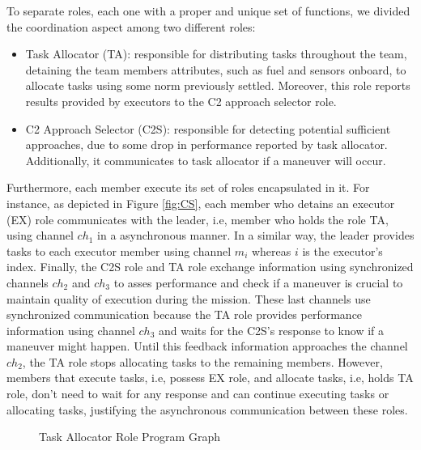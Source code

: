 To separate roles, each one with a proper and unique set of functions, we divided the coordination aspect among two different roles:

\begin{itemize}
    \item Task Allocator (TA): responsible for distributing tasks throughout the team, detaining the team members attributes, such as fuel and sensors onboard, to allocate tasks using some norm previously settled. Moreover, this role reports results provided by executors to the C2 approach selector role.
    \item C2 Approach Selector (C2S): responsible for detecting potential sufficient approaches, due to some drop in performance reported by task allocator. Additionally, it communicates to task allocator if a maneuver will occur.  
\end{itemize}

Furthermore, each member execute its set of roles encapsulated in it. For instance, as depicted in Figure \ref{fig:CS}, each member who detains an executor (EX) role communicates with the leader, i.e, member who holds the role TA, using channel \textit{$ch_1$} in a asynchronous manner. In a similar way, the leader provides tasks to each executor member using channel \textit{$m_i$} whereas $i$ is the executor's index. Finally, the C2S role and TA role exchange information using synchronized channels \textit{$ch_2$} and \textit{$ch_3$} to asses performance and check if a maneuver is crucial to maintain quality of execution during the mission. These last channels use synchronized communication because the TA role provides performance information using channel \textit{$ch_3$} and waits for the C2S's response to know if a maneuver might happen. Until this feedback information approaches the channel \textit{$ch_2$}, the TA role stops allocating tasks to the remaining members. However, members that execute tasks, i.e, possess EX role, and allocate tasks, i.e, holds TA role, don't need to wait for any response and can continue executing tasks or allocating tasks, justifying the asynchronous communication between these roles.

\begin{figure}[!ht]
    \centering
    \scalebox{.65}{}
    \caption{Task Allocator Role Program Graph}
    \label{fig:TA}
\end{figure}

